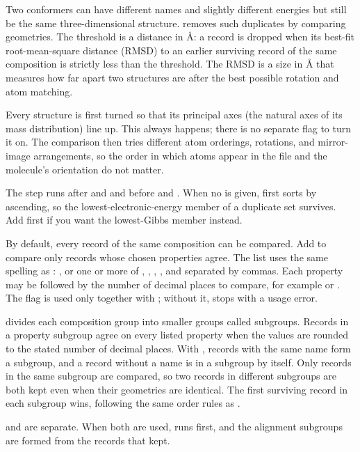 Two conformers can have different names and slightly different energies but
still be the same three-dimensional structure. 
removes such duplicates by comparing geometries. The threshold is a distance
in \AA{}: a record is dropped when its best-fit root-mean-square distance
(RMSD) to an earlier surviving record of the same composition is strictly
less than the threshold. The RMSD is a size in \AA{} that measures how far
apart two structures are after the best possible rotation and atom matching.

Every structure is first turned so that its principal axes (the natural axes
of its mass distribution) line up. This always happens; there is no separate
flag to turn it on. The comparison then tries different atom orderings,
rotations, and mirror-image arrangements, so the order in which atoms appear
in the file and the molecule's orientation do not matter.

The step runs after  and  and before
 and . When no  is given, \CJKQC{}
first sorts by  ascending, so the lowest-electronic-energy member of
a duplicate set survives. Add  first if you want the
lowest-Gibbs member instead.

By default, every record of the same composition can be compared. Add
 to compare only records whose chosen properties
agree. The list uses the same spelling as : , or one or
more of , , , , and  separated
by commas. Each property may be followed by the number of decimal places to
compare, for example  or . The flag is used only
together with ; without it, \CJKQC{} stops with a usage
error.

 divides each composition group into smaller groups
called subgroups. Records in a property subgroup agree on every listed
property when the values are rounded to the stated number of decimal places.
With , records with the same name form a subgroup, and a record
without a name is in a subgroup by itself. Only records in the same subgroup
are compared, so two records in different subgroups are both kept even when
their geometries are identical. The first surviving record in each subgroup
wins, following the same order rules as .

 and  are separate. When both are used,
 runs first, and the alignment subgroups are formed from the
records that  kept.

